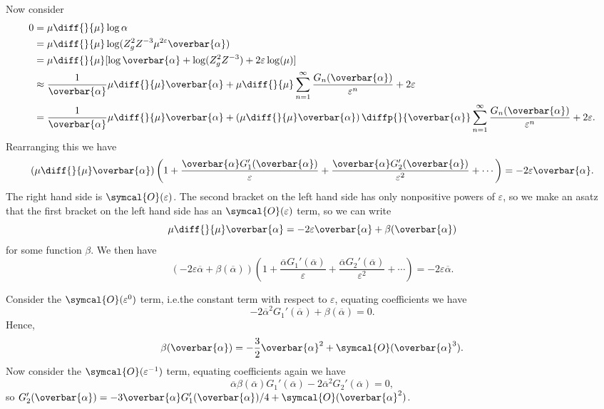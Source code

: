 \documentclass[fleqn]{NotesClass}
\newcommand{\order}{\symcal{O}}
\begin{document}
    Now consider
    \begin{align}
        0 &= \mu \diff{}{\mu} \log \alpha\\
        &= \mu \diff{}{\mu} \log(Z_g^2 Z^{-3} \mu^{2\varepsilon} \overbar{\alpha})\\
        &= \mu \diff{}{\mu} [\log\overbar{\alpha} + \log(Z_g^2 Z^{-3}) + 2\varepsilon \log(\mu)]\\
        &\approx \frac{1}{\overbar{\alpha}} \mu \diff{}{\mu} \overbar{\alpha} + \mu \diff{}{\mu} \sum_{n=1}^{\infty} \frac{G_n(\overbar{\alpha})}{\varepsilon^n} + 2\varepsilon\\
        &= \frac{1}{\overbar{\alpha}}\mu \diff{}{\mu} \overbar{\alpha} + \left( \mu \diff{}{\mu} \overbar{\alpha} \right) \diffp{}{\overbar{\alpha}} \sum_{n=1}^{\infty} \frac{G_n(\overbar{\alpha})}{\varepsilon^n} + 2\varepsilon.
    \end{align}
    Rearranging this we have
    \begin{equation}
        \left( \mu \diff{}{\mu} \overbar{\alpha} \right) \left( 1 + \frac{\overbar{\alpha}G_1'(\overbar{\alpha})}{\varepsilon} + \frac{\overbar{\alpha} G_2'(\overbar{\alpha})}{\varepsilon^2} + \dotsb \right) = -2\varepsilon\overbar{\alpha}.
    \end{equation}
    The right hand side is \(\order(\varepsilon)\).
    The second bracket on the left hand side has only nonpositive powers of \(\varepsilon\), so we make an asatz that the first bracket on the left hand side has an \(\order(\varepsilon)\) term, so we can write
    \begin{equation}
        \mu \diff{}{\mu} \overbar{\alpha} = -2\varepsilon \overbar{\alpha} + \beta(\overbar{\alpha})
    \end{equation}
    for some function \(\beta\).
    We then have
    \begin{equation}
        \left( -2\varepsilon \overbar{\alpha} + \beta(\overbar{\alpha}) \right)\left( 1 + \frac{\overbar{\alpha}G_1'(\overbar{\alpha})}{\varepsilon} + \frac{\overbar{\alpha}G_2'(\overbar{\alpha})}{\varepsilon^2} + \dotsb \right) = -2\varepsilon\overbar{\alpha}.
    \end{equation}
    
    Consider the \(\order(\varepsilon^0)\) term, i.e.\@ the constant term with respect to \(\varepsilon\), equating coefficients we have
    \begin{equation}
        -2\overbar{\alpha}^2 G_1'(\overbar{\alpha}) + \beta(\overbar{\alpha}) = 0.
    \end{equation}
    Hence,
    \begin{equation}
        \beta(\overbar{\alpha}) = -\frac{3}{2}\overbar{\alpha}^2 + \order(\overbar{\alpha}^3).
    \end{equation}
    Now consider the \(\order(\varepsilon^{-1})\) term, equating coefficients again we have
    \begin{equation}
        \overbar{\alpha} \beta(\overbar{\alpha}) G_1'(\overbar{\alpha}) - 2\overbar{\alpha}^2 G_2'(\overbar{\alpha}) = 0,
    \end{equation}
    so \(G_2'(\overbar{\alpha}) = -3\overbar{\alpha}G_1'(\overbar{\alpha})/4 + \order(\overbar{\alpha}^2)\).
    
\end{document}
